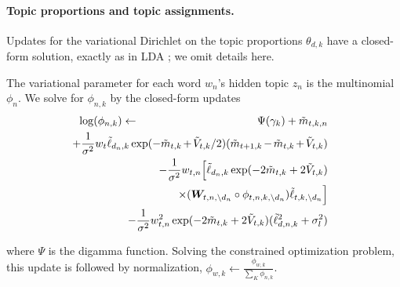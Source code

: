 \paragraph{Topic proportions and topic assignments.}
Updates for the variational Dirichlet on the topic proportions
$\theta_{d,k}$ have a closed-form solution, exactly as in LDA
\cite{blei:2003}; we omit details here.

The variational parameter for each word $w_n$'s hidden topic $z_n$ is
the multinomial $\phi_n$.  We solve for $\phi_{n,k}$ by the
closed-form updates
\begin{eqnarray*}
\small
\textstyle \log(\phi_{n,k}) & \gets & \Psi(\gamma_k) + \mv_{t,k,n} \nonumber \\
& & \hspace{-68pt} + \frac{1}{\sigma^2} w_{t} \ellv_{d_n,k} \exp(-\mv_{t,k} \hspace{-1pt} + \hspace{-1pt} \vv_{t,k} / 2) (\mv_{t+1,k} \hspace{-1pt} - \hspace{-1pt} \mv_{t,k} \hspace{-1pt} + \hspace{-1pt} \vv_{t,k})  \\
   & & \hspace{-68pt} - \frac{1}{\sigma^2} w_{t,n} \Big[ \ellv_{d_n,k} \exp(-2\mv_{t,k} + 2 \vv_{t,k}) \\
& & \hspace{-22pt} \times (\bm W_{t,n,\setminus{d_n}} \circ \phi_{t,n,k,\setminus{d_n}}) \ellv_{t,k,\setminus d_n} \Big] \\
& & \hspace{-68pt} - \frac{1}{\sigma^2} w_{t,n}^2 \exp(-2\mv_{t,k} + 2 \vv_{t,k}) (\ellv_{d,n,k}^2 + \sigma_l^2) \\
\end{eqnarray*}

\vspace{-20pt}
where $\Psi$ is the digamma function. Solving the constrained
optimization problem, this update is followed by normalization,
$\phi_{w, k} \gets \frac{\phi_{w, k}}{\sum_K \phi_{n, k}}$.
